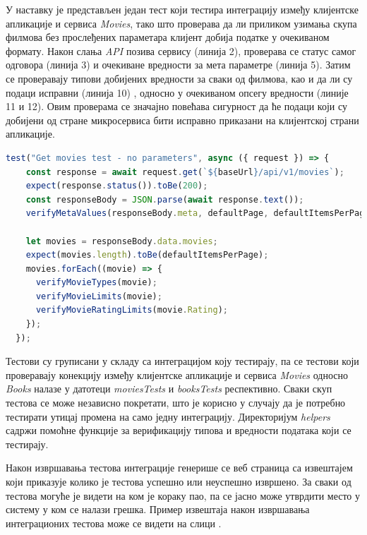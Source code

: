 \documentclass[12pt,oneside]{memoir}
\begin{document}
У наставку је представљен један тест који тестира интеграцију између клијентске апликације и сервиса \textit{Movies}, тако што проверава да ли приликом узимања скупа филмова без прослеђених параметара клијент добија податке у очекиваном формату. Након слања \textit{API} позива сервису (линија 2), проверава се статус самог одговора (линија 3) и очекиване вредности за мета параметре (линија 5). Затим се проверавају типови добијених вредности за сваки од филмова, као и да ли су подаци исправни  (линија 10) , односно у очекиваном опсегу вредности (линије 11 и 12). Овим проверама се значајно повећава сигурност да ће подаци који су добијени од стране микросервиса бити исправно приказани на клијентској страни апликације.

\begin{lstlisting}[caption= Тест интеграције сервиса \textit{Movies} и клијентске апликације, 
basicstyle=\tiny,
language=Javascript,
label={lst:integrationTest},
frame=single]
test("Get movies test - no parameters", async ({ request }) => {
    const response = await request.get(`${baseUrl}/api/v1/movies`);
    expect(response.status()).toBe(200);
    const responseBody = JSON.parse(await response.text());
    verifyMetaValues(responseBody.meta, defaultPage, defaultItemsPerPage);

    let movies = responseBody.data.movies;
    expect(movies.length).toBe(defaultItemsPerPage);
    movies.forEach((movie) => {
      verifyMovieTypes(movie);
      verifyMovieLimits(movie);
      verifyMovieRatingLimits(movie.Rating);
    });
  });
\end{lstlisting}

Тестови су груписани у складу са интеграцијом коју тестирају, па се тестови који проверавају конекцију између клијентске апликације и сервиса \textit{Movies} односно \textit{Books} налазе у датотеци \textit{moviesTests} и \textit{booksTests} респективно. Сваки скуп тестова се може независно покретати, што је корисно у случају да је потребно тестирати утицај промена на само једну интеграцију. Директоријум \textit{helpers} садржи помоћне функције за верификацију типова и вредности података који се тестирају.

Након извршавања тестова интеграције генерише се веб страница са извештајем који приказује колико је тестова успешно или неуспешно извршено. За сваки од тестова могуће је видети на ком је кораку пао, па се јасно може утврдити место у систему у ком се налази грешка. Пример извештаја након извршавања интеграционих тестова може се видети на слици .
\end{document}
